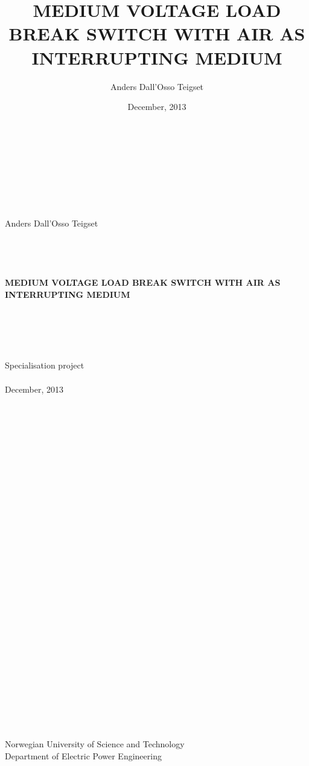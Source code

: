 \documentclass[10pt,a4paper,twoside]{article}
\author{Anders Dall'Osso Teigset}
\title{MEDIUM VOLTAGE LOAD BREAK SWITCH WITH AIR AS INTERRUPTING MEDIUM}
\date{December, 2013}
\begin{document}
    \begin{titlepage}
    \begin{center}
    \ \\
    \ \\
    \ \\
    \ \\
    \ \\
    \ \\
    Anders Dall'Osso Teigset \\
    \ \\
    \ \\
    \ \\
    \ \\{\large \bfseries
    MEDIUM VOLTAGE LOAD BREAK SWITCH WITH AIR AS INTERRUPTING MEDIUM\\
    }
    \ \\
    \ \\
    \ \\
    \ \\
    \ \\
    {\large
    Specialisation project\\
    }
    \ \\
    {December, 2013 \\}
    \ \\
    \ \\
    \ \\
    \ \\
    \ \\
    \ \\
    \ \\
    \ \\
    \ \\
    \ \\
    \ \\
    \ \\
    \ \\
    \ \\
    \ \\
    \ \\
    \ \\
    \ \\
    \ \\
    \ \\
    \ \\
    \ \\
    \ \\
    \ \\
    \ \\
    \ \\
    \ \\
    \ \\
    \ \\
   	{\large
   Norwegian University of Science and Technology\\
   Department of Electric Power Engineering\\
    }
   	\ \\
    \ \\
    \ \\
    \ \\
    \end{center}
    \end{titlepage}
\end{document}
